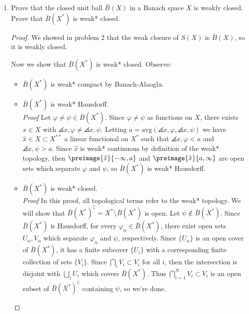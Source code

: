 \documentclass[12pt,letterpaper]{article}
\renewcommand{\phi}{\varphi}
\renewcommand{\epsilon}{\varepsilon}
\renewcommand{\closure}{\bar}
\begin{document}
\begin{enumerate}
\begin{proof}
Now observe that since $x_n\xto{w}y$, then in particular $\angles{x_n,e_j}\xto{n}\angles{y,e_j}$ where $e_j$ is the functional which simply returns the $j$-th coordinate. This means that	for all $j$ we have $ x_{nj}\xto{n}y_j$, so there exists some $M_j$ such that if $n>M_j$, we have $\abs{x_{nj}-y_j}<\epsilon$. Let $N_2=\max_{j\leq J} M_j$, then for all $n>N_2$,
\begin{equation}
\sum_{j=1}^J \abs{x_{nj}-y_j}<J\epsilon.
\end{equation}
Combining (1) and (2) yields 
$\sum_{j=1}^\infty \abs{x_{nj}-y_j}<(J+3)\epsilon,$
and after rescaling, we're done.
\end{proof}


\renewcommand{\B}{\closure{B}}
\item Prove that the closed unit ball $\B(X)$ in a Banach space $X$ is weakly closed. Prove that $\B(X^*)$ is weak* closed. 

\begin{proof}
We showed in problem 2 that the weak closure of $S(X)$ is $\B(X)$, so it is weakly closed. 

\renewcommand{\B}{\closure{B}(X^*)}
Now we show that $\B$ is weak* closed. Observe:
	\begin{itemize}
	\item $\B$ is weak* compact by Banach-Alaoglu.
	\item $\B$ is weak* Hausdorff. \\
	\textit{Proof} Let $\phi\neq\psi\in\B$. Since $\phi\neq\psi$ as functions on $X$, there exists $x\in X$ with $\angles{x,\phi}\neq\angles{x,\psi}$. Letting $a=\text{avg}(\angles{x,\phi},\angles{x,\psi})$ we have $\hat{x}\in X\subset X^{**}$ a linear functional on $X^*$ such that $\angles{x,\phi}<a$ and $\angles{x,\psi}>a$. Since $\hat{x}$ is weak* continuous by definition of the weak* topology, then $\preimage{\hat{x}}{-\infty,a}$ and $\preimage{\hat{x}}{a,\infty}$ are open sets which separate $\phi$ and $\psi$, so $\B$ is weak* Hausdorff. \qedwhite
	\item $\B$ is weak* closed. \\
	\textit{Proof} In this proof, all topological terms refer to the weak* topology. We will show that $\B^\complement=X^*\setminus\B$ is open. Let $\psi\not\in\B$. Since $\B$ is Hausdorff, for every $\phi_\alpha\in\B$, there exist open sets $U_\alpha, V_\alpha$ which separate $\phi_\alpha$ and $\psi$, respectively. Since $\{U_\alpha\}$ is an open cover of $\B$, it has a finite subcover $\{U_i\}$ with a corresponding finite collection of sets $\{V_i\}$. Since $\bigcap_i V_i\subset V_i$ for all $i$, then the intersection is disjoint with $\bigcup_i U_i$ which covers $\B$. Thus $\bigcap_{i=1}^N V_i\subset V_i$ is an open subset of $\B^\complement$ containing $\psi$, so we're done. \qedhere
	\end{itemize}
\end{proof}



\end{enumerate}
\end{document}
